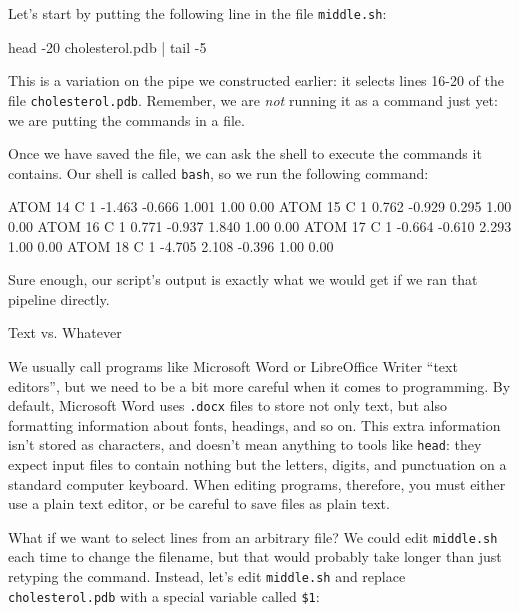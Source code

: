 Let's start by putting the following line in the file
\texttt{middle.sh}:

\begin{VerbFile}
head -20 cholesterol.pdb | tail -5
\end{VerbFile}

This is a variation on the pipe we constructed earlier: it selects lines
16-20 of the file \texttt{cholesterol.pdb}. Remember, we are \emph{not}
running it as a command just yet: we are putting the commands in a file.

Once we have saved the file, we can ask the shell to execute the
commands it contains. Our shell is called \texttt{bash}, so we run the
following command:


\begin{VerbOut}
ATOM     14  C           1      -1.463  -0.666   1.001  1.00  0.00
ATOM     15  C           1       0.762  -0.929   0.295  1.00  0.00
ATOM     16  C           1       0.771  -0.937   1.840  1.00  0.00
ATOM     17  C           1      -0.664  -0.610   2.293  1.00  0.00
ATOM     18  C           1      -4.705   2.108  -0.396  1.00  0.00
\end{VerbOut}

Sure enough, our script's output is exactly what we would get if we ran
that pipeline directly.

\begin{swcbox}{Text vs. Whatever}

We usually call programs like Microsoft Word or LibreOffice Writer
``text editors'', but we need to be a bit more careful when it comes to
programming. By default, Microsoft Word uses \texttt{.docx} files to
store not only text, but also formatting information about fonts,
headings, and so on. This extra information isn't stored as characters,
and doesn't mean anything to tools like \texttt{head}: they expect input
files to contain nothing but the letters, digits, and punctuation on a
standard computer keyboard. When editing programs, therefore, you must
either use a plain text editor, or be careful to save files as plain
text.

\end{swcbox}

What if we want to select lines from an arbitrary file? We could edit
\texttt{middle.sh} each time to change the filename, but that would
probably take longer than just retyping the command. Instead, let's edit
\texttt{middle.sh} and replace \texttt{cholesterol.pdb} with a special
variable called \texttt{\$1}:

